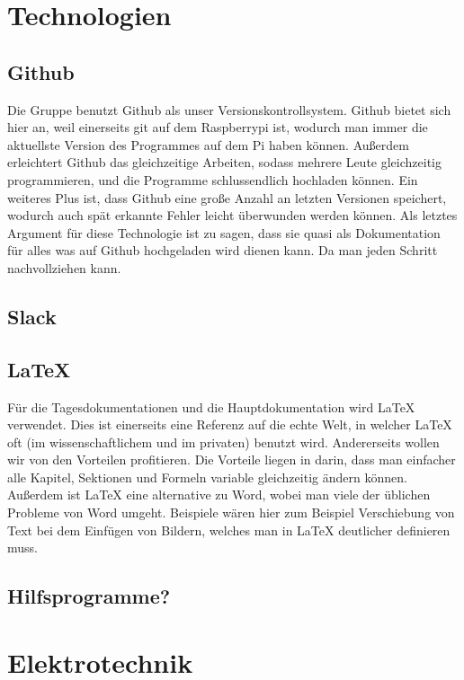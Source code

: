 \documentclass{report}
\begin{document}
\section{Technologien}

\subsection{Github}

Die Gruppe benutzt Github als unser Versionskontrollsystem. Github bietet sich hier an, weil einerseits git auf dem Raspberrypi ist, wodurch man immer die aktuellste Version des Programmes auf dem Pi haben können. Außerdem erleichtert Github das gleichzeitige Arbeiten, sodass mehrere Leute gleichzeitig programmieren, und die Programme schlussendlich hochladen können. Ein weiteres Plus ist, dass Github eine große Anzahl an letzten Versionen speichert, wodurch auch spät erkannte Fehler leicht überwunden werden können. Als letztes Argument für diese Technologie ist zu sagen, dass sie quasi als Dokumentation für alles was auf Github hochgeladen wird dienen kann. Da man jeden Schritt nachvollziehen kann. 

\subsection{Slack}



\subsection{\LaTeX}

Für die Tagesdokumentationen und die Hauptdokumentation wird LaTeX verwendet. Dies ist einerseits eine Referenz auf die echte Welt, in welcher LaTeX oft (im wissenschaftlichem und im privaten) benutzt wird. Andererseits wollen wir von den Vorteilen profitieren. Die Vorteile liegen in darin, dass man einfacher alle Kapitel, Sektionen und Formeln variable gleichzeitig ändern können. Außerdem ist LaTeX eine alternative zu Word, wobei man viele der üblichen Probleme von Word umgeht. Beispiele wären hier zum Beispiel Verschiebung von Text bei dem Einfügen von Bildern, welches man in LaTeX deutlicher definieren muss. 

\subsection{Hilfsprogramme?}

\section{Elektrotechnik}
\end{document}
